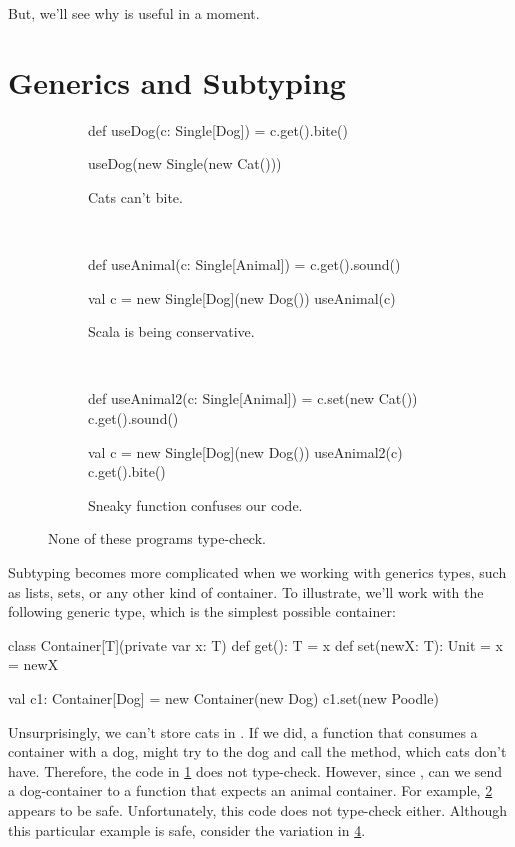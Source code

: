 \documentclass{book}
\begin{document}
But, we'll see why  is useful in a moment.

\section{Generics and Subtyping}

\begin{figure}
\begin{subfigure}[b]{0.26\textwidth}
\begin{scalacode}
def useDog(c: Single[Dog]) = {
  c.get().bite()
}

useDog(new Single(new Cat()))
\end{scalacode}
\caption{Cats can't bite.}
\label{catdog1}
\end{subfigure}
~\vrule~
\begin{subfigure}[b]{0.33\textwidth}
\begin{scalacode}
def useAnimal(c: Single[Animal]) = {
  c.get().sound()
}

val c = new Single[Dog](new Dog())
useAnimal(c)
\end{scalacode}
\label{catdog2}
\caption{Scala is being conservative.}
\end{subfigure}
~\vrule~
\begin{subfigure}[b]{0.31\textwidth}
\begin{scalacode}
def useAnimal2(c: Single[Animal]) = {
  c.set(new Cat())
  c.get().sound()
}

val c = new Single[Dog](new Dog())
useAnimal2(c)
c.get().bite()
\end{scalacode}
\label{catdog3}
\caption{Sneaky function confuses our code.}
\end{subfigure}
\caption{None of these programs type-check.}
\end{figure}

Subtyping becomes more complicated when we working with generics types, such
as lists, sets, or any other kind of container. To illustrate, we'll work
with the following generic type, which is the simplest possible container:
%
\begin{scalacode}
class Container[T](private var x: T) {
  def get(): T = x
  def set(newX: T): Unit = x = newX
}

val c1: Container[Dog] = new Container(new Dog)
c1.set(new Poodle)
\end{scalacode}

Unsurprisingly, we can't store cats in . If we did, a function
that consumes a container with a dog, might try to  the
dog and call the  method, which cats don't have.
Therefore, the code in \cref{catdog1} does not type-check.
However, since , can we send a dog-container
to a function that expects an animal container. For example, \cref{catdog2}
appears to be safe. Unfortunately, this code does not type-check either. Although this particular example
is safe, consider the variation in \cref{catdog3}.
\end{document}
